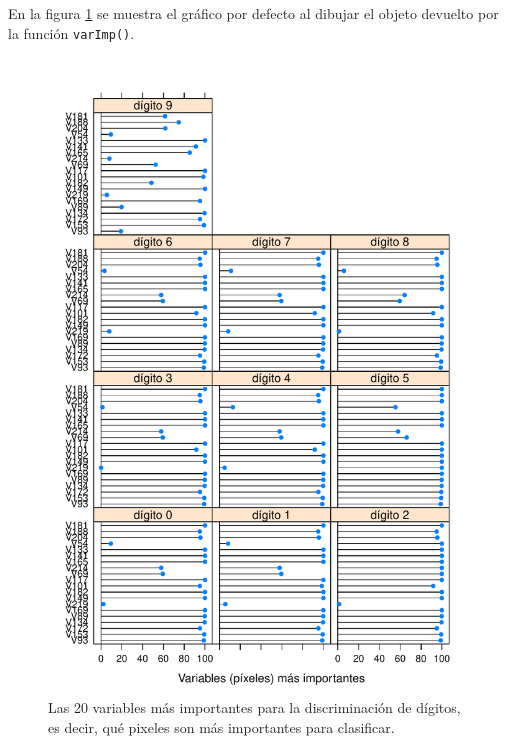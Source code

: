 \documentclass[12pt,spanish,a4paper]{article}
\newenvironment{Shaded}{\begin{snugshade}}{\end{snugshade}}
\newcommand{\DataTypeTok}[1]{\textcolor[rgb]{0.13,0.29,0.53}{#1}}
\newcommand{\DecValTok}[1]{\textcolor[rgb]{0.00,0.00,0.81}{#1}}
\newcommand{\KeywordTok}[1]{\textcolor[rgb]{0.13,0.29,0.53}{\textbf{#1}}}
\newcommand{\NormalTok}[1]{#1}
\newcommand{\OperatorTok}[1]{\textcolor[rgb]{0.81,0.36,0.00}{\textbf{#1}}}
\newcommand{\StringTok}[1]{\textcolor[rgb]{0.31,0.60,0.02}{#1}}
\numberwithin{equation}{section}
\begin{document}
En la figura \ref{fig:varimp_modelo_1_modelo_svmlinear2_paso1} se
muestra el gráfico por defecto al dibujar el objeto devuelto por la
función \texttt{varImp()}.

\begin{Shaded}
\end{Shaded}

\begin{figure}[h]

{\centering \includegraphics[width=0.8\linewidth]{graphics/svm/varimp_modelo_1_modelo_svmlinear2_paso1-1} 

}

\caption{Las 20 variables más importantes para la discriminación de dígitos, es decir, qué pixeles son más importantes para clasificar.}\label{fig:varimp_modelo_1_modelo_svmlinear2_paso1}
\end{figure}
\end{document}
